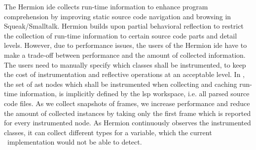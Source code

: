 \documentclass[sigplan,10pt,review,anonymous]{acmart}
\begin{document}
The Hermion \ac{ide} \cite{rothlisberger2008exploiting} collects run-time
information to enhance program comprehension by improving static source code
navigation and browsing in Squeak/Smalltalk. %
Hermion builds upon partial behavioral reflection \cite{tanter2003partial} to
restrict the collection of run-time information to certain source code parts and
detail levels. However, due to performance issues, the users of the Hermion
\ac{ide} have to make a trade-off between performance and the amount of
collected information. The users need to manually specify which classes shall be
instrumented, to keep the cost of instrumentation and reflective operations at
an acceptable level. In \graallsp, the set of \ac{ast} nodes which shall be
instrumented when collecting and caching run-time information, is implicitly
defined by the \ac{lsp} workspace, i.e. all parsed source code files. As we
collect snapshots of frames, we increase performance and reduce the amount of
collected instances by taking only the first frame which is reported for every
instrumented node. As Hermion continuously observes the instrumented classes, it
can collect different types for a variable, which the current
\graallsp~implementation would not be able to detect.
    
\end{document}

